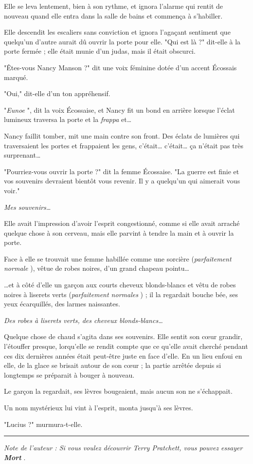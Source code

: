 Elle se leva lentement, bien à son rythme, et ignora l'alarme qui rentit de nouveau quand elle entra dans la salle de bains et commença à s'habiller.

Elle descendit les escaliers sans conviction et ignora l'agaçant sentiment que quelqu'un d'autre aurait dû ouvrir la porte pour elle. "Qui est là ?" dit-elle à la porte fermée ; elle était munie d'un judas, mais il était obscurci.

"Êtes-vous Nancy Manson ?" dit une voix féminine dotée d'un accent Écossais marqué.

"Oui," dit-elle d'un ton appréhensif.

"\emph{Eunoe} ", dit la voix Écossaise, et Nancy fit un bond en arrière lorsque l'éclat lumineux traversa la porte et la \emph{frappa}  et…

Nancy faillit tomber, mit une main contre son front. Des éclats de lumières qui traversaient les portes et frappaient les gens, c'était… c'était… ça n'était pas très surprenant…

"Pourriez-vous ouvrir la porte ?" dit la femme Écossaise. "La guerre est finie et vos souvenirs devraient bientôt vous revenir. Il y a quelqu'un qui aimerait vous voir."

\emph{Mes souvenirs…} 

Elle avait l'impression d'avoir l'esprit congestionné, comme si elle avait arraché quelque chose à son cerveau, mais elle parvint à tendre la main et à ouvrir la porte.

Face à elle se trouvait une femme habillée comme une sorcière (\emph{parfaitement normale} ), vêtue de robes noires, d'un grand chapeau pointu…

…et à côté d'elle un garçon aux courts cheveux blonds-blancs et vêtu de robes noires à liserets verts (\emph{parfaitement normales} ) ; il la regardait bouche bée, ses yeux écarquillés, des larmes naissantes.

\emph{Des robes à liserets verts, des cheveux blonds-blancs…} 

Quelque chose de chaud s'agita dans ses souvenirs. Elle sentit son cœur grandir, l'étouffer presque, lorqu'elle se rendit compte que ce qu'elle avait cherché pendant ces dix dernières années était peut-être juste en face d'elle. En un lieu enfoui en elle, de la glace se brisait autour de son cœur ; la partie arrêtée depuis si longtemps se préparait à bouger à nouveau.

Le garçon la regardait, ses lèvres bougeaient, mais aucun son ne s'échappait.

Un nom mystérieux lui vint à l'esprit, monta jusqu'à ses lèvres.

"Lucius ?" murmura-t-elle.
\par\noindent\rule{\textwidth}{0.4pt}
\emph{Note de l'auteur : Si vous voulez découvrir Terry Pratchett, vous pouvez essayer } \emph{\textbf{Mort} } .

